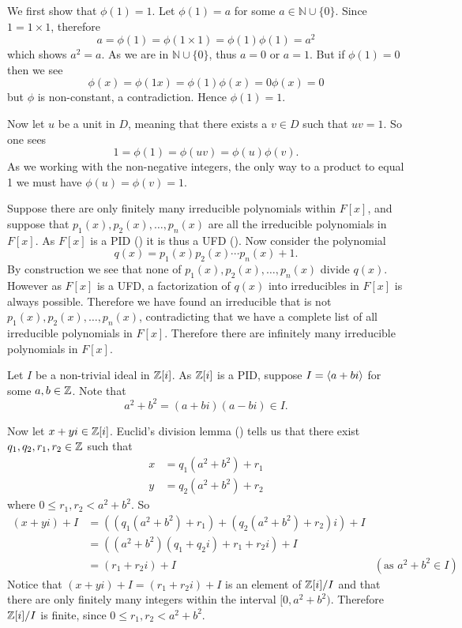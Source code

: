 \begin{questions}
    \item We first show that $\phi(1) = 1$. Let $\phi(1) = a$ for some $a \in \mathbb{N} \cup \{0\}$. Since $1 = 1 \times 1$, therefore
    \[
        a = \phi(1) = \phi(1 \times 1) = \phi(1)\phi(1) = a^2
    \]
    which shows $a^2 = a$. As we are in $\mathbb{N} \cup \{0\}$, thus $a = 0$ or $a = 1$. But if $\phi(1) = 0$ then we see
    \[
        \phi(x) = \phi(1x) = \phi(1)\phi(x) = 0\phi(x) = 0
    \]
    but $\phi$ is non-constant, a contradiction. Hence $\phi(1) = 1$.

    Now let $u$ be a unit in $D$, meaning that there exists a $v \in D$ such that $uv = 1$. So one sees
    \[
        1 = \phi(1) = \phi(uv) = \phi(u)\phi(v).
    \]
    As we working with the non-negative integers, the only way to a product to equal 1 we must have $\phi(u) = \phi(v) = 1$.

    \item Suppose there are only finitely many irreducible polynomials within $F[x]$, and suppose that $p_1(x), p_2(x), \dots, p_n(x)$ are all the irreducible polynomials in $F[x]$. As $F[x]$ is a PID () it is thus a UFD (). Now consider the polynomial
    \[
        q(x) = p_1(x)p_2(x)\cdots p_n(x) + 1.
    \]
    By construction we see that none of $p_1(x), p_2(x), \dots, p_n(x)$ divide $q(x)$. However as $F[x]$ is a UFD, a factorization of $q(x)$ into irreducibles in $F[x]$ is always possible. Therefore we have found an irreducible that is not $p_1(x), p_2(x), \dots, p_n(x)$, contradicting that we have a complete list of all irreducible polynomials in $F[x]$. Therefore there are infinitely many irreducible polynomials in $F[x]$.

    \item Let $I$ be a non-trivial ideal in $\mathbb{Z}[i]$. As $\mathbb{Z}[i]$ is a PID, suppose $I = \left\langle a+bi\right\rangle$ for some $a,b \in \mathbb{Z}$. Note that
    \[
        a^2 + b^2 = (a+bi)(a-bi) \in I.
    \]

    Now let $x+yi \in \mathbb{Z}[i]$. Euclid's division lemma () tells us that there exist $q_1, q_2, r_1, r_2 \in \mathbb{Z}$ such that
    \begin{align*}
        x &= q_1(a^2+b^2) + r_1\\
        y &= q_2(a^2+b^2) + r_2
    \end{align*}
    where $0 \leq r_1, r_2 < a^2+b^2$. So
    \begin{align*}
        (x+yi)+I &= \left(\left(q_1(a^2+b^2) + r_1\right) + \left(q_2(a^2+b^2) + r_2\right)i\right) + I\\
        &= \left((a^2+b^2)(q_1+q_2i) + r_1 + r_2i\right) + I\\
        &= (r_1 + r_2i) + I & (\text{as } a^2+b^2 \in I)
    \end{align*}
    Notice that $(x+yi)+I = (r_1+r_2i)+I$ is an element of $\mathbb{Z}[i]/I$ and that there are only finitely many integers within the interval $[0, a^2+b^2)$. Therefore $\mathbb{Z}[i]/I$ is finite, since $0 \leq r_1, r_2 < a^2+b^2$.


\end{questions}

